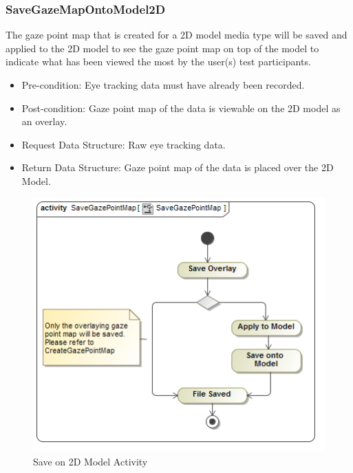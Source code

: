 	\subsubsection{SaveGazeMapOntoModel2D}
The gaze point map that is created for a 2D model media type will be saved and applied to the 2D model to see the gaze point map on top of the model to indicate what has been viewed the most by the user(s) test participants.
	\begin{itemize}
		\item Pre-condition: Eye tracking data must have already been recorded.
		\item Post-condition: Gaze point map of the data is viewable on the 2D model as an overlay.
		\item Request Data Structure: Raw eye tracking data.
		\item Return Data Structure: Gaze point map of the data is placed over the 2D Model.
	\end{itemize}
	\begin{figure}[!ht]
		\centering	
		\includegraphics[scale=0.5,width=15cm,keepaspectratio]{Diagrams/Activity_Diagram__SaveGazePointMap__SaveGazePointMap.png}	
		\caption{Save on 2D Model Activity}
	\end{figure}

